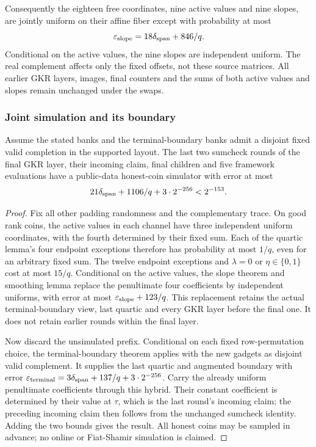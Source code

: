 Consequently the eighteen free coordinates, nine active values and nine slopes, are jointly uniform on their affine fiber except with probability at most
\[
 \varepsilon_{\rm slope}=18\delta_{\rm span}+846/q.
\]
Conditional on the active values, the nine slopes are independent uniform. The real complement affects only the fixed offsets, not these source matrices. All earlier GKR layers, images, final counters and the sums of both active values and slopes remain unchanged under the swaps.

\subsubsection{Joint simulation and its boundary}

\begin{theorem}
Assume the stated banks and the terminal-boundary banks admit a disjoint fixed valid completion in the supported layout. The last two sumcheck rounds of the final GKR layer, their incoming claim, final children and five framework evaluations have a public-data honest-coin simulator with error at most
\[
 21\delta_{\rm span}+1106/q+3\cdot2^{-256}<2^{-153}.
\]
\end{theorem}
\begin{proof}
Fix all other padding randomness and the complementary trace. On good rank coins, the active values in each channel have three independent uniform coordinates, with the fourth determined by their fixed sum. Each of the quartic lemma's four endpoint exceptions therefore has probability at most $1/q$, even for an arbitrary fixed sum. The twelve endpoint exceptions and $\lambda=0$ or $\eta\in\{0,1\}$ cost at most $15/q$. Conditional on the active values, the slope theorem and smoothing lemma replace the penultimate four coefficients by independent uniforms, with error at most $\varepsilon_{\rm slope}+123/q$. This replacement retains the actual terminal-boundary view, last quartic and every GKR layer before the final one. It does not retain earlier rounds within the final layer.

Now discard the unsimulated prefix. Conditional on each fixed row-permutation choice, the terminal-boundary theorem applies with the new gadgets as disjoint valid complement. It supplies the last quartic and augmented boundary with error $\varepsilon_{\rm terminal}=3\delta_{\rm span}+137/q+3\cdot2^{-256}$. Carry the already uniform penultimate coefficients through this hybrid. Their constant coefficient is determined by their value at $\tau$, which is the last round's incoming claim; the preceding incoming claim then follows from the unchanged sumcheck identity. Adding the two bounds gives the result. All honest coins may be sampled in advance; no online or Fiat-Shamir simulation is claimed.
\end{proof}

